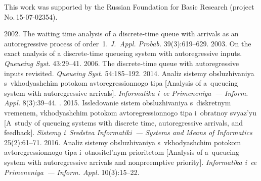 




\Ack
\noindent
This work was supported by the Russian Foundation for Basic Research (project 
No.\,15-07-02354).




  \begin{multicols}{2}

\renewcommand{\bibname}{\protect\rmfamily References}

{\small\frenchspacing
 {%
 \begin{thebibliography}{9}
2002. The waiting time analysis of a discrete-time queue with arrivals as an 
autoregressive process of order~1. \textit{J.~Appl. Probab.} 39(3):619--629.
 2003. 
On the exact analysis of a discrete-time queueing system with autoregressive inputs. 
\textit{Queueing Syst.} 43:29--41.
 2006. The discrete-time queue with autoregressive inputs revisited. 
\textit{Queueing Syst.} 54:185--192.
 2014. Analiz sistemy obsluzhivaniya 
s~vkhodyashchim potokom avtoregressionnogo tipa [Analysis of 
a~queueing system with autoregressive arrivals]. 
\textit{Informatika i~ee Primeneniya~--- Inform. Appl.} 8(3):39--44.
. 2015. Issledovanie sistem obsluzhivaniya 
s~diskretnym vremenem, vkhodyashchim potokom avtoregressionnogo tipa i~obratnoy 
svyaz'yu [A~study of queueing systems with discrete time, autoregressive arrivals, 
and feedback]. \textit{Sistemy i~Sredstva Informatiki~--- Systems and Means of 
Informatics} 25(2):61--71.
 2016. Analiz sistemy obsluzhivaniya 
s~vkhodyashchim potokom avtoregressionnogo tipa i~otnositel'nym prioritetom 
[Analysis of a~queueing system with autoregressive arrivals and nonpreemptive priority].
\textit{Informatika i~ee Primeneniya~--- Inform. Appl.} 10(3):15--22.
\end{thebibliography}

 }
 }

\end{multicols}

